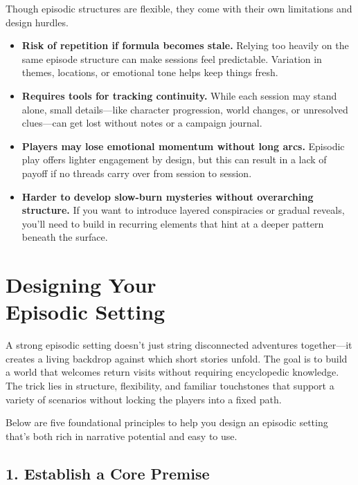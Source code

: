 Though episodic structures are flexible, they come with their own limitations and design hurdles.

\begin{itemize}
    \item \textbf{Risk of repetition if formula becomes stale.} Relying too heavily on the same episode structure can make sessions feel predictable. Variation in themes, locations, or emotional tone helps keep things fresh.

    \item \textbf{Requires tools for tracking continuity.} While each session may stand alone, small details—like character progression, world changes, or unresolved clues—can get lost without notes or a campaign journal.

    \item \textbf{Players may lose emotional momentum without long arcs.} Episodic play offers lighter engagement by design, but this can result in a lack of payoff if no threads carry over from session to session.

    \item \textbf{Harder to develop slow-burn mysteries without overarching structure.} If you want to introduce layered conspiracies or gradual reveals, you’ll need to build in recurring elements that hint at a deeper pattern beneath the surface.
\end{itemize}


\section[Designing Your Episodic Setting]{Designing Your\\ Episodic Setting}

A strong episodic setting doesn’t just string disconnected adventures together—it creates a living backdrop against which short stories unfold. The goal is to build a world that welcomes return visits without requiring encyclopedic knowledge. The trick lies in structure, flexibility, and familiar touchstones that support a variety of scenarios without locking the players into a fixed path.

Below are five foundational principles to help you design an episodic setting that’s both rich in narrative potential and easy to use.

\subsection*{1. Establish a Core Premise}

